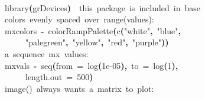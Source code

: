 \documentclass[a4paper]{article}
\newcommand{\hlnumber}[1]{\textcolor[rgb]{0.0823529411764706,0.0784313725490196,0.709803921568627}{#1}}%
\newcommand{\hlfunctioncall}[1]{\textcolor[rgb]{1,0,0}{#1}}%
\newcommand{\hlstring}[1]{\textcolor[rgb]{0.6,0.6,1}{#1}}%
\newcommand{\hlkeyword}[1]{\textcolor[rgb]{0,0,0}{\textbf{#1}}}%
\newcommand{\hlargument}[1]{\textcolor[rgb]{0.694117647058824,0.247058823529412,0.0196078431372549}{#1}}%
\newcommand{\hlcomment}[1]{\textcolor[rgb]{0.8,0.8,0.8}{#1}}%
\newcommand{\hlassignement}[1]{\textcolor[rgb]{0.215686274509804,0.215686274509804,0.384313725490196}{\textbf{#1}}}%
\newcommand{\hlsymbol}[1]{\textcolor[rgb]{0,0,0}{#1}}%
\newcommand{\hlprompt}[1]{\textcolor[rgb]{0,0,0}{#1}}%
\newcommand{\hlstd}[1]{\textcolor[rgb]{0,0,0}{#1}}%
\newenvironment{Houtput}{\raggedright}{%
%
}
\begin{document}
\begin{Houtput}
\hspace*{\fill}\\
\hlstd{}\ttfamily\noindent
\hlprompt{\usebox{\hlnormalsizeboxgreaterthan}{\ }}\hlfunctioncall{library}\hlkeyword{(}\hlsymbol{grDevices}\hlkeyword{)}{\ }{\ }\hlcomment{\usebox{\hlnormalsizeboxhash}{\ }this{\ }package{\ }is{\ }included{\ }in{\ }base}\mbox{}
\normalfont
\hspace*{\fill}\\
\hlstd{}\ttfamily\noindent
\hlprompt{\usebox{\hlnormalsizeboxgreaterthan}{\ }}\hlcomment{\usebox{\hlnormalsizeboxhash}{\ }colors{\ }evenly{\ }spaced{\ }over{\ }range(values):}\mbox{}
\normalfont
\hspace*{\fill}\\
\hlstd{}\ttfamily\noindent
\hlprompt{\usebox{\hlnormalsizeboxgreaterthan}{\ }}\hlsymbol{mxcolors}{\ }\hlassignement{\usebox{\hlnormalsizeboxlessthan}-}{\ }\hlfunctioncall{colorRampPalette}\hlkeyword{(}\hlfunctioncall{c}\hlkeyword{(}\hlstring{"white"}\hlkeyword{,}{\ }\hlstring{"blue"}\hlkeyword{,}\hspace*{\fill}\\
\hlstd{}\hlprompt{{\ }}{\ }{\ }{\ }{\ }\hlstring{"palegreen"}\hlkeyword{,}{\ }\hlstring{"yellow"}\hlkeyword{,}{\ }\hlstring{"red"}\hlkeyword{,}{\ }\hlstring{"purple"}\hlkeyword{)}\hlkeyword{)}\mbox{}
\normalfont
\hspace*{\fill}\\
\hlstd{}\ttfamily\noindent
\hlprompt{\usebox{\hlnormalsizeboxgreaterthan}{\ }}\hlcomment{\usebox{\hlnormalsizeboxhash}{\ }a{\ }sequence{\ }mx{\ }values:}\mbox{}
\normalfont
\hspace*{\fill}\\
\hlstd{}\ttfamily\noindent
\hlprompt{\usebox{\hlnormalsizeboxgreaterthan}{\ }}\hlsymbol{mxvals}{\ }\hlassignement{\usebox{\hlnormalsizeboxlessthan}-}{\ }\hlfunctioncall{seq}\hlkeyword{(}\hlargument{from}{\ }\hlargument{=}{\ }\hlfunctioncall{log}\hlkeyword{(}\hlnumber{1e-05}\hlkeyword{)}\hlkeyword{,}{\ }\hlargument{to}{\ }\hlargument{=}{\ }\hlfunctioncall{log}\hlkeyword{(}\hlnumber{1}\hlkeyword{)}\hlkeyword{,}\hspace*{\fill}\\
\hlstd{}\hlprompt{{\ }}{\ }{\ }{\ }{\ }\hlargument{length.out}{\ }\hlargument{=}{\ }\hlnumber{500}\hlkeyword{)}\mbox{}
\normalfont
\hspace*{\fill}\\
\hlstd{}\ttfamily\noindent
\hlprompt{\usebox{\hlnormalsizeboxgreaterthan}{\ }}\hlcomment{\usebox{\hlnormalsizeboxhash}{\ }image(){\ }always{\ }wants{\ }a{\ }matrix{\ }to{\ }plot:}\mbox{}

\end{Houtput}
\end{document}
